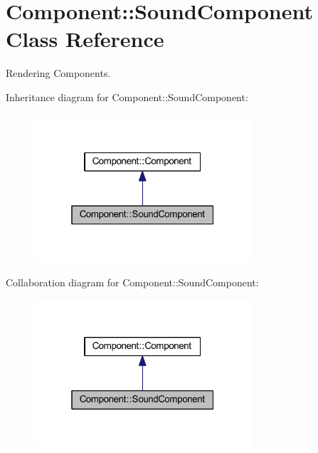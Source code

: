 \hypertarget{class_component_1_1_sound_component}{}\section{Component\+:\+:Sound\+Component Class Reference}
\label{class_component_1_1_sound_component}


Rendering Components.  




Inheritance diagram for Component\+:\+:Sound\+Component\+:
\nopagebreak
\begin{figure}[H]
\begin{center}
\leavevmode
\includegraphics[width=229pt]{class_component_1_1_sound_component__inherit__graph}
\end{center}
\end{figure}


Collaboration diagram for Component\+:\+:Sound\+Component\+:
\nopagebreak
\begin{figure}[H]
\begin{center}
\leavevmode
\includegraphics[width=229pt]{class_component_1_1_sound_component__coll__graph}
\end{center}
\end{figure}
